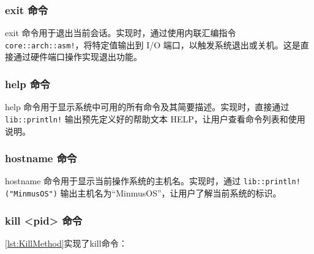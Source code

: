 \subsubsection{exit 命令}

exit 命令用于退出当前会话。实现时，通过使用内联汇编指令 \texttt{core::arch::asm!}，将特定值输出到 I/O 端口，以触发系统退出或关机。这是直接通过硬件端口操作实现退出功能。

\subsubsection{help 命令}

help 命令用于显示系统中可用的所有命令及其简要描述。实现时，直接通过 \texttt{lib::println!} 输出预先定义好的帮助文本 HELP，让用户查看命令列表和使用说明。

\subsubsection{hostname 命令}

hostname 命令用于显示当前操作系统的主机名。实现时，通过 \texttt{lib::println!("MinmusOS")} 输出主机名为“MinmusOS”，让用户了解当前系统的标识。

\subsubsection{kill <pid> 命令}

\cref{lst:KillMethod}实现了kill命令：

